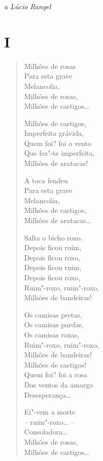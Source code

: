 
\begin{flushright}
\emph{a Lúcio Rangel}
\end{flushright}

\section*{I}

\begin{verse}
Milhões de rosas\\
Para esta grave\\
Melancolia,\\
Milhões de rosas,\\
Milhões de castigos\ldots{}

Milhões de castigos,\\
Imperfeita grávida,\\
Quem foi? foi o vento\\
Que fez"-te imperfeita,\\
Milhões de aratacas!

A toca fendeu\\
Para esta grave\\
Melancolia,\\
Milhões de castigos,\\
Milhões de aratacas\ldots{}

Salta o bicho roxo.\\
Depois ficou ruim,\\
Depois ficou roxo,\\
Depois ficou ruim,\\
Depois ficou roxo,\\
Ruim"-roxo, ruim"-roxo,\\
Milhões de bandeiras!

Os camisas pretas,\\
Os camisas pardas,\\
Os camisas roxas,\\
Ruim"-roxo, ruim"-roxo,\\
Milhões de bandeiras!\\
Milhões de castigos!\\
Quem foi? foi a rosa\\
Dos ventos da amarga\\
Desesperança\ldots{}

Ei"-vem a morte\\
-- ruim"-roxo\ldots{} --\\
Consoladora\ldots{}\\
Milhões de rosas,\\
Milhões de castigos\ldots{}
\end{verse}

